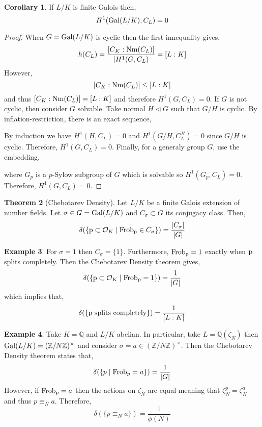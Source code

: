 \documentclass[12pt]{extarticle}
\newcommand{\divides}{\mid}
\newcommand{\Z}{\mathbb{Z}}
\newcommand{\Q}{\mathbb{Q}}
\newcommand{\ints}[1]{\mathcal{O}_{#1}}
\theoremstyle{definition}
\newtheorem{theorem}{Theorem}[section]
\newtheorem{corollary}[theorem]{Corollary}
\newtheorem{example}[theorem]{Example}
\begin{document}
\begin{corollary}
If $L / K$ is finite Galois then,
\[ H^1(\mathrm{Gal} (L/K), C_L) = 0 \]
\end{corollary}

\begin{proof}
When $G = \mathrm{Gal} (L/K)$ is cyclic then the first innequality gives,
\[ h(C_L) = \frac{[C_K : \mathrm{Nm}(C_L)]}{|H^1(G, C_L)} = [L : K] \]
However,
\[ [C_K : \mathrm{Nm}(C_L)] \le [L : K] \] 
and thus $[C_K : \mathrm{Nm}(C_L)] = [L : K]$ and therefore $H^1(G, C_L) = 0$. 
If $G$ is not cyclic, then consider $G$ solvable. Take normal $H \triangleleft G$ such that $G / H$ is cyclic. By inflation-restriction, there is an exact sequence,
\begin{center}
\end{center} 
By induction we have $H^1(H, C_L) = 0$ and $H^1(G/H, C_L^H) = 0$ since $G/H$ is cyclic. Therefore, $H^1(G, C_L) = 0$. Finally, for a generaly group $G$, use the embedding,
\begin{center}
\end{center}
where $G_p$ is a $p$-Sylow subgroup of $G$ which is solvable so $H^1(G_p, C_L) = 0$. Therefore, $H^1(G, C_L) = 0$.
\end{proof}

\begin{theorem}[Chebotarev Density]
Let $L / K$ be a finite Galois extension of number fields. Let $\sigma \in G = \mathrm{Gal} (L/K)$ and $C_\sigma \subset G$ its conjugacy class. Then,
\[ \delta(\{ \p \subset \ints{K} \mid \Frob_{\p} \in C_\sigma \}) = \frac{|C_\sigma|}{|G|} \]
\end{theorem}

\begin{example}
For $\sigma = 1$ then $C_\sigma = \{ 1 \}$. Furthermore, $\mathrm{Frob}_{\mathrm{p}} = 1$ exactly when $\mathrm{p}$ splits completely. Then the Chebotarev Density theorem gives,
\[ \delta(\{ \p \subset \ints{K} \mid \Frob_\p = 1 \}) = \frac{1}{|G|} \]
which implies that,
\[ \delta(\{ \mathrm{p} \text{ splits completely} \}) = \frac{1}{[L : K]} \]
\end{example}

\begin{example}
Take $K = \Q$ and $L / K$ abelian. In particular, take $L = \Q(\zeta_N)$ then $\Gal{L/K} = (\Z / N \Z)^\times$ and consider $\sigma = a \in (\Z / N \Z)^\times$. Then the Chebotarev Density theorem states that,
\[ \delta(\{ p  \mid \mathrm{Frob}_p = a \}) = \frac{1}{|G|} \]
However, if $\mathrm{Frob}_p = a$ then the actions on $\zeta_N$ are equal meaning that $\zeta_N^p = \zeta_N^a$ and thus $p \equiv_N a$. Therefore,
\[ \delta(\{ p \equiv_N a \}) = \frac{1}{\phi(N)} \]
\end{example}
\end{document}

